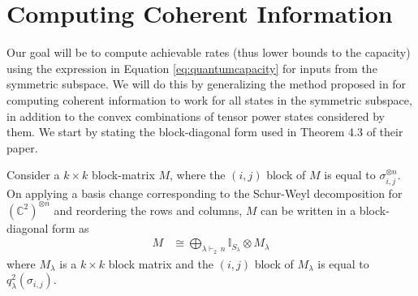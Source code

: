 \documentclass[11pt]{article}
\begin{document}
\section{Computing Coherent Information}\label{sec:computingci}
 Our goal will be to compute achievable rates (thus lower bounds to the capacity) using the expression in Equation \ref{eq:quantumcapacity} for inputs from the symmetric subspace. We will do this by generalizing the method proposed in \cite{bhalerao2025improvingquantumcommunicationrates} for computing coherent information to work for all states in the symmetric subspace, in addition to the convex combinations of tensor power states considered by them. We start by stating the block-diagonal form used in Theorem 4.3 of their paper.

 \begin{lemma}\label{lem:block-diag}
     Consider a $k \times k$ block-matrix $M$, where the $(i, j)$ block of $M$ is equal to $\sigma_{i, j}^{\otimes n}$. On applying a basis change corresponding to the Schur-Weyl decomposition for $(\mathbb{C}^2)^{\otimes n}$ and reordering the rows and columns, $M$ can be written in a block-diagonal form as
     \begin{align*}
         M &\cong \bigoplus_{\lambda \vdash_2\, n} \mathbb{I}_{S_{\lambda}} \otimes M_{\lambda}
     \end{align*}
     where $M_{\lambda}$ is a $k \times k$ block matrix and the $(i, j)$ block of $M_{\lambda}$ is equal to $q^2_{\lambda}(\sigma_{i,j})$.
 \end{lemma}
\end{document}
